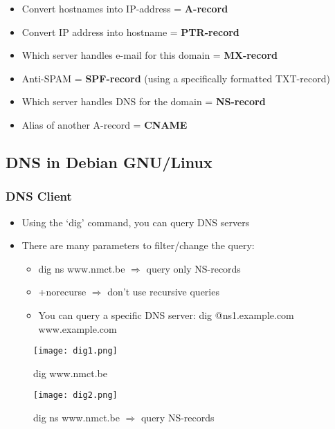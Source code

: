 \documentclass{article}
\begin{document}
\begin{itemize}
    \item Convert hostnames into IP-address = \textbf{A-record}
    \item Convert IP address into hostname = \textbf{PTR-record}
    \item Which server handles e-mail for this domain = \textbf{MX-record}
    \item Anti-SPAM = \textbf{SPF-record} (using a specifically formatted TXT-record)
    \item Which server handles DNS for the domain = \textbf{NS-record}
    \item Alias of another A-record = \textbf{CNAME}
\end{itemize}

\subsection{DNS in Debian GNU/Linux}

\subsubsection{DNS Client}

\begin{itemize}
    \item Using the `dig' command, you can query DNS servers
    \item There are many parameters to filter/change the query:
    \begin{itemize}
        \item dig ns www.nmct.be $\Rightarrow$ query only NS-records
        \item +norecurse $\Rightarrow$ don't use recursive queries
        \item You can query a specific DNS server: dig @ns1.example.com www.example.com
    \end{itemize}
\end{itemize}

\begin{figure}[H]
    \centering
    \texttt{[image: dig1.png]}
    \caption{dig www.nmct.be}
\end{figure}

\begin{figure}[H]
    \centering
    \texttt{[image: dig2.png]}
    \caption{dig ns www.nmct.be $\Rightarrow$ query NS-records}
\end{figure}
\end{document}
